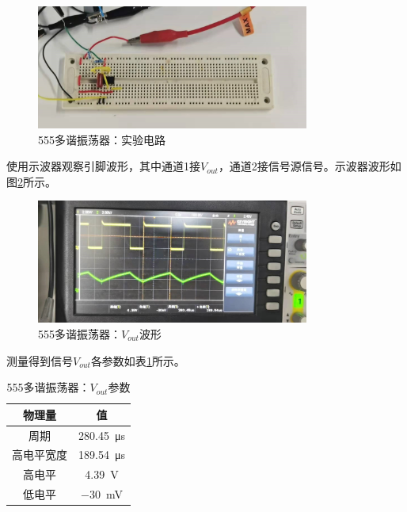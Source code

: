 \documentclass[UTF8]{ctexart}
\numberwithin{figure}{subsection}
\numberwithin{table}{subsection}
\numberwithin{equation}{subsection}
\begin{document}
\begin{figure}[H]
    \begin{center}
        \includegraphics[width=0.8\textwidth]{555/multiosci/circuit.jpg}
    \end{center}
    \caption{555多谐振荡器：实验电路}
    \label{multiosci exp cir}
\end{figure}

\par 使用示波器观察引脚波形，其中通道1接\(V_{out}\)，通道2接信号源信号。示波器波形如图\ref{multiosci vout osci}所示。

\begin{figure}[H]
    \begin{center}
        \includegraphics[width=0.8\textwidth]{555/multiosci/vout.jpg}
    \end{center}
    \caption{555多谐振荡器：\(V_{out}\)波形}
    \label{multiosci vout osci}
\end{figure}

测量得到信号\(V_{out}\)各参数如表\ref{multiosci vout table}所示。

\begin{table}
    \begin{center}
        \begin{tabular}{c | c}
            物理量 & 值 \\
            \hline
            周期 & \SI{280.45}{\micro\second} \\
            高电平宽度 & \SI{189.54}{\micro\second} \\
            高电平 & \SI{4.39}{\volt} \\
            低电平 & \SI{-30}{\milli\volt} \\
        \end{tabular}
        \label{multiosci vout table}
        \caption{555多谐振荡器：\(V_{out}\)参数}
    \end{center}
\end{table}
\end{document}
